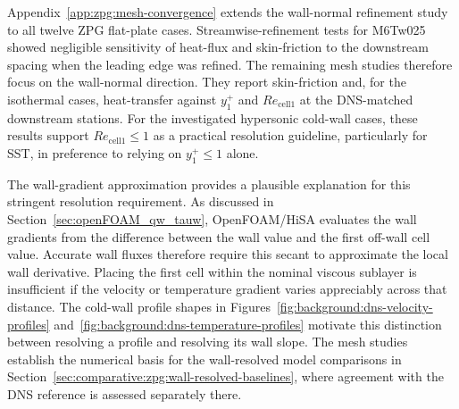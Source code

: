 Appendix~\ref{app:zpg:mesh-convergence} extends the wall-normal refinement study to all twelve ZPG flat-plate cases. Streamwise-refinement tests for M6Tw025 showed negligible sensitivity of heat-flux and skin-friction to the downstream spacing when the leading edge was refined. The remaining mesh studies therefore focus on the wall-normal direction. They report skin-friction and, for the isothermal cases, heat-transfer against \(y_1^+\) and \(Re_{\mathrm{cell1}}\) at the DNS-matched downstream stations. For the investigated hypersonic cold-wall cases, these results support \(Re_{\mathrm{cell1}}\le1\) as a practical resolution guideline, particularly for SST, in preference to relying on \(y_1^+\le1\) alone.
\par\medskip

The wall-gradient approximation provides a plausible explanation for this stringent resolution requirement. As discussed in Section~\ref{sec:openFOAM_qw_tauw}, OpenFOAM/HiSA evaluates the wall gradients from the difference between the wall value and the first off-wall cell value. Accurate wall fluxes therefore require this secant to approximate the local wall derivative. Placing the first cell within the nominal viscous sublayer is insufficient if the velocity or temperature gradient varies appreciably across that distance. The cold-wall profile shapes in Figures~\ref{fig:background:dns-velocity-profiles} and~\ref{fig:background:dns-temperature-profiles} motivate this distinction between resolving a profile and resolving its wall slope. The mesh studies establish the numerical basis for the wall-resolved model comparisons in Section~\ref{sec:comparative:zpg:wall-resolved-baselines}, where agreement with the DNS reference is assessed separately there.
